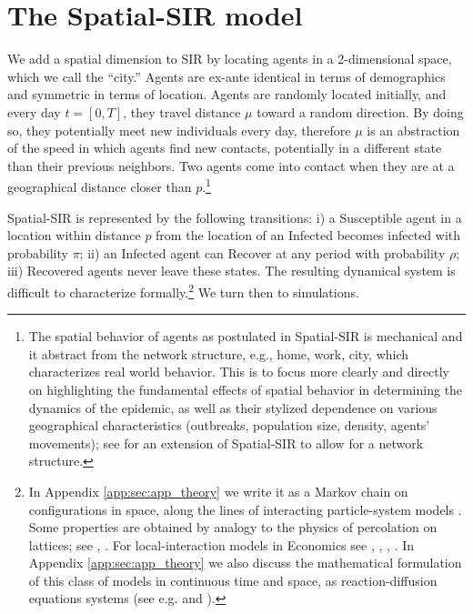 \documentclass[english,11pt]{article}
\begin{document}
\section{The Spatial-SIR model} \label{sec:spatialSIRtheory}

We add a spatial dimension to SIR by locating agents in a 2-dimensional space, which we call the ``city.'' Agents are ex-ante identical in terms
of demographics and symmetric in terms of location.
Agents are randomly located initially, and every day $t=[0,T]$, they travel distance $\mu$ 
toward a random direction. \label{travelspeed}By doing so, they potentially meet new individuals every day, therefore $\mu$ is an abstraction of the speed in which agents find new contacts, potentially in a different state than their previous neighbors.
Two agents come into contact when they are at a geographical distance closer than $p$.\footnote{\label{spatialb}The spatial behavior of agents as postulated in Spatial-SIR  is mechanical and it abstract from the network structure, e.g., home, work, city, which characterizes real world behavior. This is to focus more clearly and directly on highlighting the fundamental effects of spatial behavior in determining the dynamics of the epidemic, as well as their stylized dependence on various  geographical characteristics (outbreaks, population size, density, agents' movements); see \cite{bisinmoro2020} for an extension of Spatial-SIR to allow for a network structure.} 

Spatial-SIR is represented by the following transitions: 
i) a Susceptible agent in a location within distance $p$ from the location of an Infected becomes infected with
probability $\pi$;
ii) an Infected agent can Recover at any period with probability $\rho$;  
iii) Recovered agents never leave these states. 
The resulting dynamical system is difficult to characterize formally.\footnote{\label{reac-diff}In Appendix \ref{app:sec:app_theory} we write it as a Markov chain on configurations in space, along the lines of interacting particle-system models \citep{ kindermann1980american, liggett2012interacting}. Some properties are obtained by analogy to the physics of percolation on lattices; see  \cite{grassberger1983critical}, \cite{tome2010critical}. For local-interaction models in Economics see  \cite{blume2011identification}, \cite{conley2007estimating}, \cite{glaeser2001measuring},  \cite{ozgur2011dynamic}. In Appendix \ref{app:sec:app_theory} we also discuss the mathematical formulation of this class of models in continuous time and space, as reaction-diffusion equations systems (see e.g. \cite{chinviriyasit2010numerical} and \cite{wu2017epidemic}).}
We turn then to simulations. 
\end{document}
